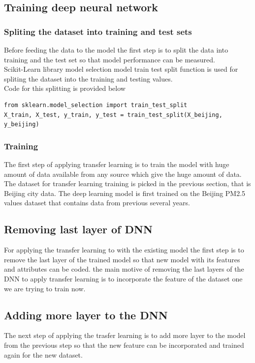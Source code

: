 \subsection{Training deep neural network}

\subsubsection{Spliting the dataset into training and test sets}
Before feeding the data to the model the first step is to split the data into training and the test set so that model performance can be measured.\\

Scikit-Learn library model selection model train test split function is used for spliting the dataset into the training and testing values.\\

Code for this splitting is provided below\\

\begin{verbatim}
from sklearn.model_selection import train_test_split
X_train, X_test, y_train, y_test = train_test_split(X_beijing, y_beijing)
\end{verbatim}
\subsubsection{Training}

The first step of applying transfer learning is to train the model with huge amount of data available from any source which give the huge amount of data. The dataset for transfer learning training is picked in the previous section, that is Beijing city data. The deep learning model is first trained on the Beijing PM2.5 values dataset that contains data from previous several years.

\subsection{Removing last layer of DNN}
For applying the transfer learning to with the existing model the first step is to remove the last layer of the trained model so that new model with its features and attributes can be coded. the main motive of removing the last layers of the DNN to apply transfer learning is to incorporate the feature of the dataset one we are trying to train now.

\subsection{Adding more layer to the DNN}
The next step of applying the trasfer learning is to add more layer to the model from the previous step so that the new feature can be incorporated and trained again for the new dataset. 

